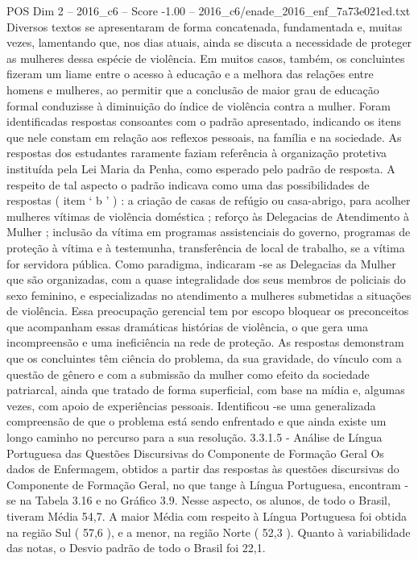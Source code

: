 \begin{textsample}{POS Dim 2 – 2016\_c6 – Score -1.00 – 2016\_c6/enade\_2016\_enf\_7a73e021ed.txt}
Diversos textos se apresentaram de forma concatenada, fundamentada e, muitas vezes, lamentando que, nos dias atuais, ainda se discuta a necessidade de proteger as mulheres dessa espécie de violência.
Em muitos casos, também, os concluintes fizeram um liame entre o acesso à educação e a melhora das relações entre homens e mulheres, ao permitir que a conclusão de maior grau de educação formal conduzisse à diminuição do índice de violência contra a mulher.
Foram identificadas respostas consoantes com o padrão apresentado, indicando os itens que nele constam em relação aos reflexos pessoais, na família e na sociedade.
As respostas dos estudantes raramente faziam referência à organização protetiva instituída pela Lei Maria da Penha, como esperado pelo padrão de resposta.
A respeito de tal aspecto o padrão indicava como uma das possibilidades de respostas ( item ‘ b ’ ) : a criação de casas de refúgio ou casa-abrigo, para acolher mulheres vítimas de violência doméstica ; reforço às Delegacias de Atendimento à Mulher ; inclusão da vítima em programas assistenciais do governo, programas de proteção à vítima e à testemunha, transferência de local de trabalho, se a vítima for servidora pública.
Como paradigma, indicaram -se as Delegacias da Mulher que são organizadas, com a quase integralidade dos seus membros de policiais do sexo feminino, e especializadas no atendimento a mulheres submetidas a situações de violência.
Essa preocupação gerencial tem por escopo bloquear os preconceitos que acompanham essas dramáticas histórias de violência, o que gera uma incompreensão e uma ineficiência na rede de proteção.
As respostas demonstram que os concluintes têm ciência do problema, da sua gravidade, do vínculo com a questão de gênero e com a submissão da mulher como efeito da sociedade patriarcal, ainda que tratado de forma superficial, com base na mídia e, algumas vezes, com apoio de experiências pessoais.
Identificou -se uma generalizada compreensão de que o problema está sendo enfrentado e que ainda existe um longo caminho no percurso para a sua resolução. 3.3.1.5 - Análise de Língua Portuguesa das Questões Discursivas do Componente de Formação Geral Os dados de Enfermagem, obtidos a partir das respostas às questões discursivas do Componente de Formação Geral, no que tange à Língua Portuguesa, encontram -se na Tabela 3.16 e no Gráfico 3.9.
Nesse aspecto, os alunos, de todo o Brasil, tiveram Média 54,7.
A maior Média com respeito à Língua Portuguesa foi obtida na região Sul ( 57,6 ), e a menor, na região Norte ( 52,3 ).
Quanto à variabilidade das notas, o Desvio padrão de todo o Brasil foi 22,1.

\end{textsample}

